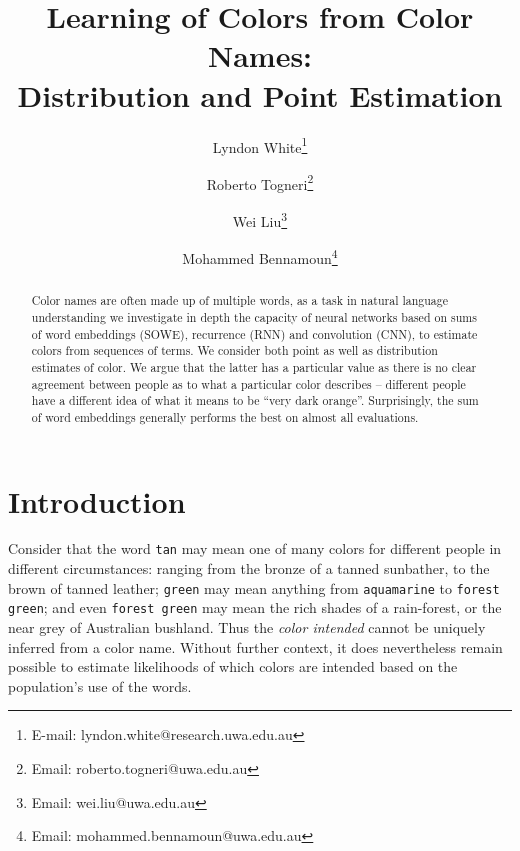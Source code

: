 \documentclass[]{book}
\begin{document}
\title{Learning of Colors from Color Names: \\ Distribution and Point Estimation}
\author{Lyndon White\thanks{E-mail: {lyndon.white@research.uwa.edu.au}}}

\author{Roberto Togneri\thanks{Email: {roberto.togneri@uwa.edu.au}}}
\author{Wei Liu\thanks{Email: {wei.liu@uwa.edu.au}}}
\author{Mohammed Bennamoun\thanks{Email: {mohammed.bennamoun@uwa.edu.au}}}



\maketitle
%
\begin{abstract}
Color names are often made up of multiple words,
as a task in natural language understanding we investigate in depth the capacity of neural networks based on sums of word embeddings (SOWE), recurrence (RNN) and convolution (CNN), to estimate colors from sequences of terms.
We consider both point as well as distribution estimates of color.
We argue that the latter has a particular value as there is no clear agreement between people as to what a particular color describes -- different people have a different idea of what it means to be ``very dark orange''.
Surprisingly, the sum of word embeddings generally performs the best on almost all evaluations.
\end{abstract}

\section{Introduction}\label{sec:intro}

Consider that the word \texttt{tan} may mean one of many colors for different people in different circumstances: ranging from the bronze of a tanned sunbather, to the brown of tanned leather;
\texttt{green} may mean anything from \texttt{aquamarine} to \texttt{forest green};
and even \texttt{forest green} may mean the rich shades of a rain-forest, or the near grey of Australian bushland.
Thus the \emph{color intended} cannot be uniquely inferred from a color name. Without further context, it does nevertheless remain possible to estimate likelihoods of which colors are intended based on the population's use of the words.
\end{document}
